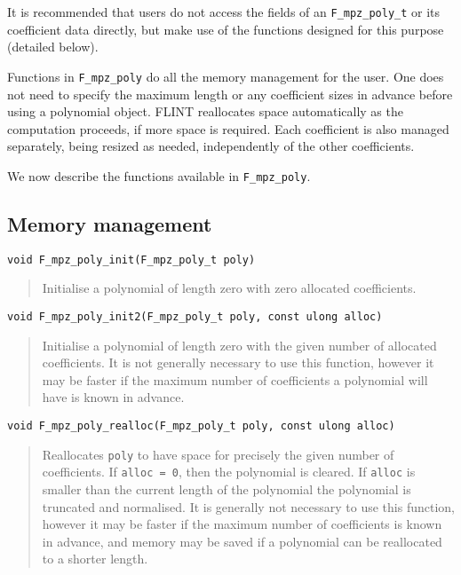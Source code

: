 \documentclass[a4paper,10pt]{article}
\newcommand{\code}{\lstinline}
\begin{document}
It is recommended that users do not access the fields of an \code{F_mpz_poly_t} or its coefficient 
data directly, but make use of the functions designed for this purpose (detailed below).

Functions in \code{F_mpz_poly} do all the memory management for the user. One does not need to specify 
the maximum length or any coefficient sizes in advance before using a polynomial object. FLINT 
reallocates space automatically as the computation proceeds, if more space is required. Each coefficient
is also managed separately, being resized as needed, independently of the other coefficients.

We now describe the functions available in \code{F_mpz_poly}.

\subsection{Memory management}

\begin{lstlisting}
void F_mpz_poly_init(F_mpz_poly_t poly)
\end{lstlisting}
\begin{quote}
Initialise a polynomial of length zero with zero allocated coefficients.
\end{quote}

\begin{lstlisting}
void F_mpz_poly_init2(F_mpz_poly_t poly, const ulong alloc)
\end{lstlisting}
\begin{quote}
Initialise a polynomial of length zero with the given number of allocated coefficients. It is not 
generally necessary to use this function, however it may be faster if the maximum number of coefficients
a polynomial will have is known in advance.
\end{quote}

\begin{lstlisting}
void F_mpz_poly_realloc(F_mpz_poly_t poly, const ulong alloc)
\end{lstlisting}
\begin{quote}
Reallocates \code{poly} to have space for precisely the given number of coefficients. If \code{alloc = 0}, 
then the polynomial is cleared. If \code{alloc} is smaller than the current length of the polynomial
the polynomial is truncated and normalised. It is generally not necessary to use this function, however
it may be faster if the maximum number of coefficients is known in advance, and memory may be saved
if a polynomial can be reallocated to a shorter length. 
\end{quote}
\end{document}
